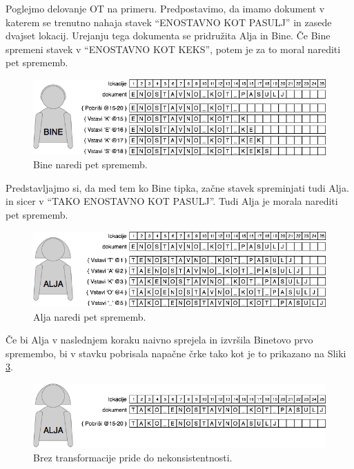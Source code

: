 \documentclass[a4paper, 12pt, twoside]{book}
\begin{document}
\bigskip

Poglejmo delovanje OT na primeru. Predpostavimo, da imamo dokument v katerem se trenutno nahaja stavek “ENOSTAVNO KOT PASULJ” in zasede dvajset lokacij. Urejanju tega dokumenta se pridružita Alja in Bine. Če Bine spremeni stavek v “ENOSTAVNO KOT KEKS”, potem je za to moral narediti pet sprememb.

\begin{figure}[placement h]
\begin{center}
\includegraphics[width=12cm]{ot1.png}
\end{center}
\caption{Bine naredi pet sprememb.}
\label{ot1}
\end{figure}

Predstavljajmo si, da med tem ko Bine tipka, začne stavek spreminjati tudi Alja. in sicer v “TAKO ENOSTAVNO KOT PASULJ”. Tudi Alja je morala narediti pet sprememb.

\begin{figure}[placement h]
\begin{center}
\includegraphics[width=12cm]{ot2.png}
\end{center}
\caption{Alja naredi pet sprememb.}
\label{ot2}
\end{figure}

Če bi Alja v naslednjem koraku naivno sprejela in izvršila Binetovo prvo spremembo, bi v stavku pobrisala napačne črke tako kot je to prikazano na Sliki \ref{ot3}.

\begin{figure}[placement h]
\begin{center}
\includegraphics[width=12cm]{ot3.png}
\end{center}
\caption{Brez transformacije pride do nekonsistentnosti.}
\label{ot3}
\end{figure}
\end{document}

